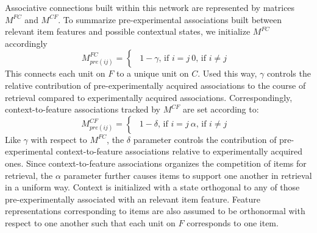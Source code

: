 {}\markdownRendererInterblockSeparator
{}Associative connections built within this network are represented by matrices $M^{FC}$ and $M^{CF}$.\markdownRendererInterblockSeparator
{}To summarize pre-experimental associations built between relevant item features and possible contextual states, we initialize $M^{FC}$ accordingly\markdownRendererInterblockSeparator
{}$$M^{FC}_{pre(ij)} = \begin{cases} \begin{alignedat}{2} 1 - \gamma \text{, if } i=j \ 0 \text{, if } i \neq j\ \end{alignedat} \end{cases}$$\markdownRendererInterblockSeparator
{}This connects each unit on $F$ to a unique unit on $C$. Used this way, $\gamma$ controls the relative contribution of pre-experimentally acquired associations to the course of retrieval compared to experimentally acquired associations. Correspondingly, context-to-feature associations tracked by $M^{CF}$ are set according to:\markdownRendererInterblockSeparator
{}$$M^{CF}_{pre(ij)} = \begin{cases} \begin{alignedat}{2} 1 - \delta \text{, if } i=j \ \alpha \text{, if } i \neq j\ \end{alignedat} \end{cases}$$\markdownRendererInterblockSeparator
{}Like $\gamma$ with respect to $M^{FC}$, the $\delta$ parameter controls the contribution of pre-experimental context-to-feature associations relative to experimentally acquired ones. Since context-to-feature associations organizes the competition of items for retrieval, the $\alpha$ parameter further causes items to support one another in retrieval in a uniform way.\markdownRendererInterblockSeparator
{}Context is initialized with a state orthogonal to any of those pre-experimentally associated with an relevant item feature. Feature representations corresponding to items are also assumed to be orthonormal with respect to one another such that each unit on $F$ corresponds to one item.\relax